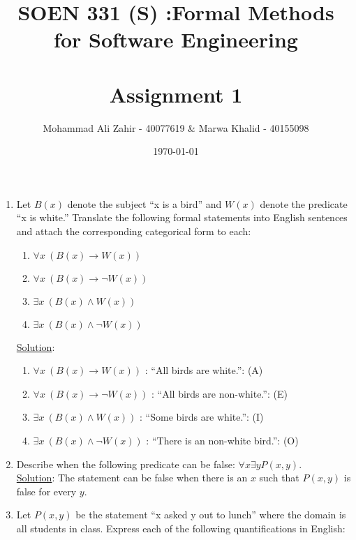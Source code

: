 \documentclass[12pt]{article}
\title{SOEN 331 (S) :Formal Methods\\for Software Engineering\\
\ \\
Assignment 1}
\author{Mohammad Ali Zahir - 40077619 & Marwa Khalid - 40155098}
\date{\today}
\begin{document}
\maketitle



\newpage
\begin{enumerate}

\item Let $B(x)$ denote the subject ``x is a bird'' and $W(x)$ denote the predicate ``x is white.'' Translate the following formal statements into English sentences and attach the corresponding categorical form to each:

\begin{enumerate}
\item $\forall x~(B(x) \rightarrow W(x))$


\item $\forall x~(B(x) \rightarrow \neg W(x))$ 


\item $\exists x~(B(x) \wedge W(x))$ 


\item $\exists x~(B(x) \wedge \neg W(x))$ 
\end{enumerate}

\noindent \underline{Solution}: \\

\begin{enumerate}
\item $\forall x~(B(x) \rightarrow W(x))$ : ``All birds are white.'': (A)
\item $\forall x~(B(x) \rightarrow \neg W(x))$ : ``All birds are non-white.'': (E)
\item $\exists x~(B(x) \wedge W(x))$ : ``Some birds are white.'': (I)
\item $\exists x~(B(x) \wedge \neg W(x))$ : ``There is an non-white bird.'': (O)
\end{enumerate}


\item Describe when the following predicate can be false: $\forall x \exists y P(x, y)$.\\

\noindent \underline{Solution}: The statement can be false when there is an $x$ such that $P(x, y)$ is false for every $y$.



\item Let $P(x, y)$ be the statement ``x asked y out to lunch'' where the domain is all students in class. Express each of the following quantifications in English:


\end{enumerate}
\end{document}
